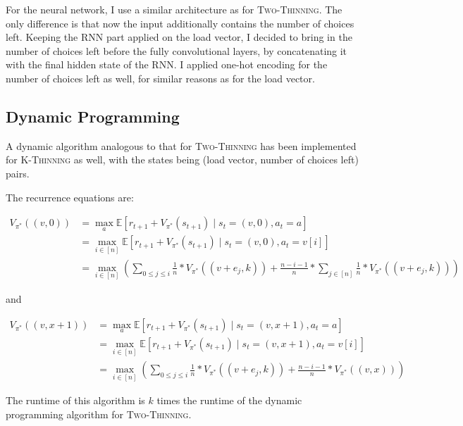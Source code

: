 For the neural network, I use a similar architecture as for \textsc{Two-Thinning}. The only difference is that now the input additionally contains the number of choices left. Keeping the RNN part applied on the load vector, I decided to bring in the number of choices left before the fully convolutional layers, by concatenating it with the final hidden state of the RNN. I applied one-hot encoding for the number of choices left as well, for similar reasons as for the load vector.


\subsection{Dynamic Programming}


A dynamic algorithm analogous to that for \textsc{Two-Thinning} has been implemented for \textsc{K-Thinning} as well, with the states being (load vector, number of choices left) pairs.


The recurrence equations are:


\begin{equation} \label{eq:kthinning-dynamicprogramming-0left}
\begin{split}
    V_{\pi^*}((v, 0)) &= \max_a \mathbb{E} [r_{t+1} + V_{\pi^*}(s_{t+1}) \mid s_t=(v,0), a_t=a] \\
    &= \max_{i \in [n]} \mathbb{E} [r_{t+1} + V_{\pi^*}(s_{t+1}) \mid s_t=(v,0), a_t=v[i]] \\
    &= \max_{i \in [n]} (\sum_{0\leq j \leq i} \frac{1}{n}*V_{\pi^*}((v+e_j,k)) + \frac{n-i-1}{n} * \sum_{j \in [n]} \frac{1}{n}*V_{\pi^*}((v+e_j,k)))
\end{split}
\end{equation}


and 


\begin{equation} \label{eq:kthinning-dynamicprogramming-xleft}
\begin{split}
    V_{\pi^*}((v, x+1)) &= \max_a \mathbb{E} [r_{t+1} + V_{\pi^*}(s_{t+1}) \mid s_t=(v,x+1), a_t=a] \\
    &= \max_{i \in [n]} \mathbb{E} [r_{t+1} + V_{\pi^*}(s_{t+1}) \mid s_t=(v, x+1), a_t=v[i]] \\
    &= \max_{i \in [n]} (\sum_{0\leq j \leq i} \frac{1}{n}*V_{\pi^*}((v+e_j,k)) + \frac{n-i-1}{n} * V_{\pi^*}((v, x)))
\end{split}
\end{equation}

The runtime of this algorithm is $k$ times the runtime of the dynamic programming algorithm for \textsc{Two-Thinning}.


